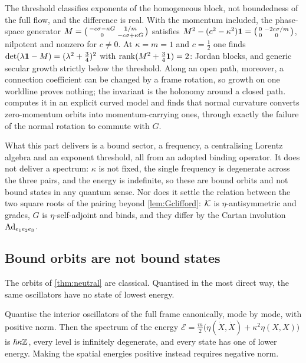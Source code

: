 The threshold classifies exponents of the homogeneous block, not boundedness of the full flow, and the difference is real. With the momentum
included, the phase-space generator $M=\bigl(\begin{smallmatrix}-c\sigma-\kappa G&\mathbf 1/m\\0&-c\sigma+\kappa G\end{smallmatrix}\bigr)$ satisfies
$M^2-(c^2-\kappa^2)\mathbf 1=\bigl(\begin{smallmatrix}0&-2c\sigma/m\\0&0\end{smallmatrix}\bigr)$, nilpotent and nonzero for $c\neq0$. At $\kappa=m=1$ and
$c=\tfrac12$ one finds $\det(\lambda\mathbf 1-M)=(\lambda^2+\tfrac34)^2$ with $\operatorname{rank}(M^2+\tfrac34\mathbf 1)=2$: Jordan blocks, and generic secular growth strictly
below the threshold. Along an open path, moreover, a connection coefficient can be changed by a frame rotation, so growth on one worldline
proves nothing; the invariant is the holonomy around a closed path.  computes it in an explicit curved model and finds that
normal curvature converts zero-momentum orbits into momentum-carrying ones, through exactly the failure of the normal rotation to commute with
$G$.

What this part delivers is a bound sector, a frequency, a centralising Lorentz algebra and an exponent threshold, all from an adopted binding
operator. It does not deliver a spectrum: $\kappa$ is not fixed, the single frequency is degenerate across the three pairs, and the energy is
indefinite, so these are bound orbits and not bound states in any quantum sense. Nor does it settle the relation between the two square roots of
the pairing beyond \cref{lem:Gclifford}: $\mathcal K$ is $\eta$-antisymmetric and grades, $G$ is $\eta$-self-adjoint and binds, and they differ by the
Cartan involution $\operatorname{Ad}_{e_1e_2e_3}$.

\subsection{Bound orbits are not bound states}
\label{sec:noground}

The orbits of \cref{thm:neutral} are classical. Quantised in the most direct way, the same oscillators have no state of lowest energy.

\begin{corollary}
\label{mb:noground}
Quantise the interior oscillators of the full frame canonically, mode by mode, with positive norm. Then the spectrum of the energy
$\mathcal E=\tfrac m2\bigl(\eta(\dot X,\dot X)+\kappa^2\eta(X,X)\bigr)$ is $\hbar\kappa\mathbb{Z}$, every level is infinitely degenerate, and every state has one
of lower energy. Making the spatial energies positive instead requires negative norm.
\end{corollary}

